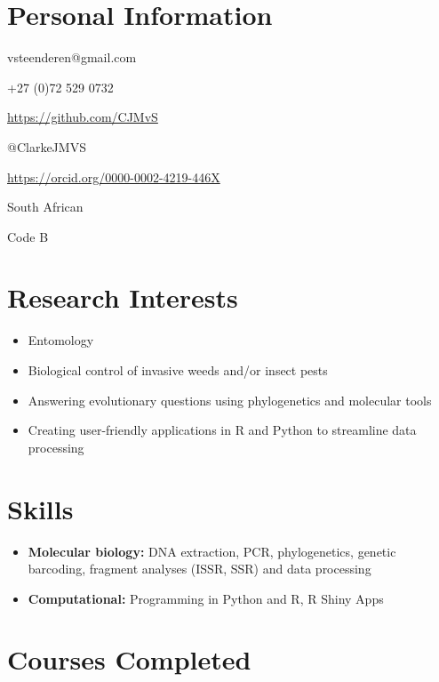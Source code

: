 \documentclass{article}
\begin{document}
\makecvtitle 

\section{Personal Information}
\begin{description}[widest=Driver's licence:]
\item[Email \Letter:] vsteenderen@gmail.com
\item[Cell \Telefon:] +27 (0)72 529 0732
\item[GitHub \faGithub:] \url{https://github.com/CJMvS}
\item[Twitter \faTwitter:] @ClarkeJMVS
\item[ORCID ID:] \url{https://orcid.org/0000-0002-4219-446X} 
\item[Citizenship:] South African
\item[Driver’s licence:] Code B
\end{description}

\section{Research Interests}

\begin{itemize}
\item Entomology
\item Biological control of invasive weeds and/or insect pests
\item Answering evolutionary questions using phylogenetics and molecular tools
\item Creating user-friendly applications in R and Python to streamline data processing

\end{itemize}

\section{Skills}

\begin{itemize}
\item \textbf{Molecular biology:} DNA extraction, PCR, phylogenetics, genetic barcoding, fragment analyses (ISSR, SSR) and data processing
\item \textbf{Computational:} Programming in Python and R, R Shiny Apps
\end{itemize}
 
\section{Courses Completed}
\end{document}
